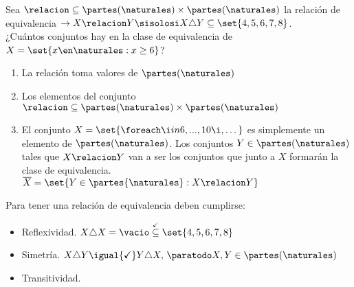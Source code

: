 \begin{enunciado}{\ejercicio}
Sea $\relacion \subseteq \partes(\naturales) \times \partes(\naturales)$ la relación de equivalencia
$\to X \relacion Y \sisolosi X \triangle Y \subseteq \set{4,5,6,7,8}$.\\
¿Cuántos conjuntos hay en la clase de equivalencia de $X = \set{x \en \naturales : x \geq 6}$?

\end{enunciado}

\begin{enumerate}
	\item La relación toma valores de $\partes(\naturales)$

	\item Los elementos del conjunto $\relacion \subseteq \partes(\naturales) \times \partes(\naturales)$

	\item El conjunto $X = \set{\foreach \i in {6,...,10}{\i, }\dots}$ es simplemente un elemento de $\partes(\naturales)$.
	      Los conjuntos $Y \in \partes(\naturales)$ tales que $X \relacion Y$ van a ser los conjuntos que junto a $X$ formarán la
	      clase de equivalencia.\\
	      $ \overline{X} = \set{Y \in \partes{\naturales} : X \relacion Y}$
\end{enumerate}

Para tener una relación de equivalencia deben cumplirse:
\begin{itemize}
	\item Reflexividad. $X \triangle X = \vacio \stackrel{\checkmark}\subseteq \set{4,5,6,7,8}$
	\item Simetría. $X \triangle Y \igual{\checkmark} Y \triangle X,\, \paratodo X,Y \in \partes(\naturales)$
	\item Transitividad.
\end{itemize}

